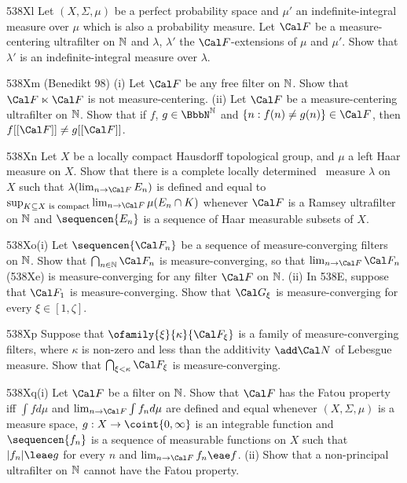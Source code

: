 {\spheader 538Xl Let $(X,\Sigma,\mu)$ be a perfect probability space and
$\mu'$ an indefinite-integral measure over $\mu$ which is also a
probability measure.   Let $\Cal F$ be a measure-centering ultrafilter on
$\Bbb N$ and $\lambda$, $\lambda'$ the $\Cal F$-extensions of $\mu$ and
$\mu'$.   Show that $\lambda'$ is an
indefinite-integral measure over $\lambda$.

\sqheader 538Xm  ({\smc Benedikt 98})
(i) Let $\Cal F$ be any free filter on $\Bbb N$.   Show that
$\Cal F\ltimes\Cal F$ is not measure-centering.   
(ii) Let $\Cal F$ be a measure-centering ultrafilter on $\Bbb N$.
Show that if $f$, $g\in\NN$ and $\{n:f(n)\ne g(n)\}\in\Cal F$, then
$f[[\Cal F]]\ne g[[\Cal F]]$.   

\spheader 538Xn
Let $X$ be a locally compact Hausdorff topological group,
and $\mu$ a left Haar measure on $X$.   Show that there is a
complete locally determined \lti\ measure
$\lambda$ on $X$ such that
$\lambda(\lim_{n\to\Cal F}E_n)$ is defined and equal to
$\sup_{K\subseteq X\text{ is compact}}\lim_{n\to\Cal F}\mu(E_n\cap K)$
whenever $\Cal F$ is a Ramsey ultrafilter on
$\Bbb N$ and $\sequencen{E_n}$ is a sequence of Haar measurable subsets of
$X$.

\spheader 538Xo(i) Let $\sequencen{\Cal F_n}$ be a sequence of
measure-converging filters on $\Bbb N$.
Show that $\bigcap_{n\in\Bbb N}\Cal F_n$ is measure-converging, so that
$\lim_{n\to\Cal F}\Cal F_n$ (538Xe) is measure-converging for any
filter $\Cal F$ on $\Bbb N$.
(ii) In 538E, suppose that $\Cal F_1$ is measure-converging.
Show that $\Cal G_{\xi}$ is measure-converging for every $\xi\in[1,\zeta]$.

\spheader 538Xp Suppose that
$\ofamily{\xi}{\kappa}{\Cal F_{\xi}}$ is a family of measure-converging
filters, where $\kappa$ is non-zero and
less than the additivity $\add\Cal N$ of
Lebesgue measure.   Show that $\bigcap_{\xi<\kappa}\Cal F_{\xi}$ is
measure-converging.

\spheader 538Xq(i)
Let $\Cal F$ be a filter on $\Bbb N$.   Show that
$\Cal F$ has the Fatou property iff $\int fd\mu$ and
$\lim_{n\to\Cal F}\int f_nd\mu$ are defined and
equal whenever $(X,\Sigma,\mu)$ is a
measure space, $g:X\to\coint{0,\infty}$ is an integrable function and
$\sequencen{f_n}$ is a sequence of measurable functions on $X$ such that
$|f_n|\leae g$ for every $n$ and $\lim_{n\to\Cal F}f_n\eae f$.
(ii) Show that a non-principal ultrafilter on $\Bbb N$ cannot
have the Fatou property.   

}
